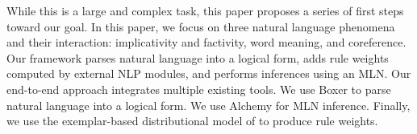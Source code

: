 While this is a large and complex task, this paper proposes a series
of first steps toward our goal. 
In this paper, we focus on three natural language phenomena and their
interaction: implicativity and factivity, word meaning, and coreference.
Our framework parses natural language
into a logical form, adds rule weights computed by external NLP
modules, and performs inferences using an MLN. Our end-to-end approach
integrates multiple existing tools.
We use Boxer
\citep{bos:coling2004} to parse natural language into a logical form.
We use Alchemy \citep{kok:tr05} for MLN inference. Finally, we use the
exemplar-based distributional model of \citet{erk:acl2010} to produce
rule weights.
